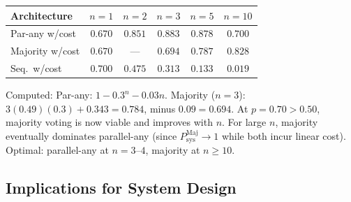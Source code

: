 \begin{example}[Performance Comparison at $p = 0.70$, $c = 0.03$]
\label{ex:p70}
\begin{center}
\begin{tabular}{l|ccccc}
Architecture & $n=1$ & $n=2$ & $n=3$ & $n=5$ & $n=10$ \\
\hline
Par-any w/cost & $0.670$ & $0.851$ & $0.883$ & $0.878$ & $0.700$ \\
Majority w/cost & $0.670$ & --- & $0.694$ & $0.787$ & $0.828$ \\
Seq.\ w/cost & $0.700$ & $0.475$ & $0.313$ & $0.133$ & $0.019$ \\
\end{tabular}
\end{center}
Computed: Par-any: $1-0.3^n - 0.03n$. Majority ($n=3$):
$3(0.49)(0.3) + 0.343 = 0.784$, minus $0.09 = 0.694$.
At $p = 0.70 > 0.50$, majority voting is now viable and improves with $n$.
For large $n$, majority eventually dominates parallel-any (since
$P_{\mathrm{sys}}^{\mathrm{Maj}} \to 1$ while both incur linear cost).
Optimal: parallel-any at $n = 3$--$4$, majority at $n \geq 10$.
\end{example}

\subsection{Implications for System Design}
\label{subsec:design}

